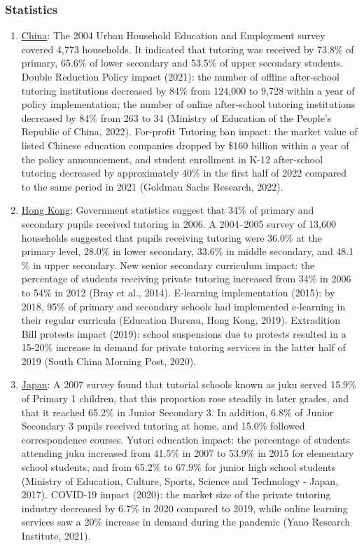\documentclass[12pt,a4paper,onecolumn]{article}
\numberwithin{equation}{section}
\begin{document}
\subsubsection{Statistics}
\begin{enumerate}
    \item \hyperlink{https://www.adb.org/sites/default/files/publication/29777/shadow-education.pdf}{China}: The 2004 Urban Household Education and Employment survey covered 4,773 households. It indicated that tutoring was received by 73.8$\%$ of primary, 65.6$\%$ of lower secondary and 53.5$\%$ of upper secondary students. Double Reduction Policy impact (2021): the number of offline after-school tutoring institutions decreased by 84$\%$ from 124,000 to 9,728 within a year of policy implementation; the number of online after-school tutoring institutions decreased by 84$\%$ from 263 to 34 (Ministry of Education of the People's Republic of China, 2022). For-profit Tutoring ban impact: the market value of listed Chinese education companies dropped by \$160 billion within a year of the policy announcement, and student enrollment in K-12 after-school tutoring decreased by approximately 40$\%$ in the first half of 2022 compared to the same period in 2021 (Goldman Sachs Research, 2022).
    \item \hyperlink{https://www.adb.org/sites/default/files/publication/29777/shadow-education.pdf}{Hong Kong}: Government statistics suggest that 34$\%$ of primary and secondary pupils received tutoring in 2006. A 2004–2005 survey of 13,600 households suggested that pupils receiving tutoring were 36.0$\%$ at the primary level, 28.0$\%$ in lower secondary, 33.6$\%$ in middle secondary, and 48.1$\%$ in upper secondary. New senior secondary curriculum impact: the percentage of students receiving private tutoring increased from 34$\%$ in 2006 to 54$\%$ in 2012 (Bray et al., 2014). E-learning implementation (2015): by 2018, 95$\%$ of primary and secondary schools had implemented e-learning in their regular curricula (Education Bureau, Hong Kong, 2019). Extradition Bill protests impact (2019): school suspensions due to protests resulted in a 15-20$\%$ increase in demand for private tutoring services in the latter half of 2019 (South China Morning Post, 2020).
    \item \hyperlink{https://www.adb.org/sites/default/files/publication/29777/shadow-education.pdf}{Japan}: A 2007 survey found that tutorial schools known as juku served 15.9$\%$ of Primary 1 children, that this proportion rose steadily in later grades, and that it reached 65.2$\%$ in Junior Secondary 3. In addition, 6.8$\%$ of Junior Secondary 3 pupils received tutoring at home, and 15.0$\%$ followed correspondence courses. Yutori education impact: the percentage of students attending juku increased from 41.5$\%$ in 2007 to 53.9$\%$ in 2015 for elementary school students, and from 65.2$\%$ to 67.9$\%$ for junior high school students (Ministry of Education, Culture, Sports, Science and Technology - Japan, 2017). COVID-19 impact (2020): the market size of the private tutoring industry decreased by 6.7$\%$ in 2020 compared to 2019, while online learning services saw a 20$\%$ increase in demand during the pandemic (Yano Research Institute, 2021).

\end{enumerate}
\end{document}
